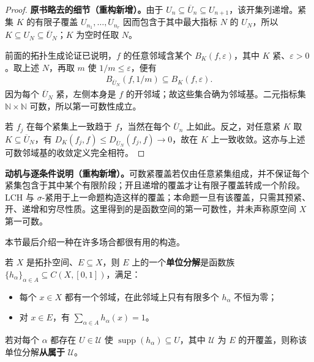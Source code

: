 \documentclass[../../main.tex]{subfiles}%
\begin{document}
\begin{proof}
\textbf{原书略去的细节（重构新增）。}由于 $U_n\subseteq\overline U_n\subseteq U_{n+1}$，该开集列递增。紧集 $K$ 的有限子覆盖 $U_{n_1},\ldots,U_{n_r}$ 因而包含于其中最大指标 $N$ 的 $U_N$，所以 $K\subseteq U_N\subseteq\overline U_N$；$K$ 为空时任取 $N$。

前面的拓扑生成论证已说明，$f$ 的任意邻域含某个 $B_K(f,\varepsilon)$，其中 $K$ 紧、$\varepsilon>0$。取上述 $N$，再取 $m$ 使 $1/m\le\varepsilon$，便有
\begin{align*}
B_{\overline U_N}(f,1/m)\subseteq B_K(f,\varepsilon).
\end{align*}
因为每个 $\overline U_N$ 紧，左侧本身是 $f$ 的开邻域；故这些集合确为邻域基。二元指标集 $\mathbb N\times\mathbb N$ 可数，所以第一可数性成立。

若 $f_j$ 在每个紧集上一致趋于 $f$，当然在每个 $\overline U_n$ 上如此。反之，对任意紧 $K$ 取 $K\subseteq\overline U_N$，有 $D_K(f_j,f)\le D_{\overline U_N}(f_j,f)\to0$，故在 $K$ 上一致收敛。这亦与上述可数邻域基的收敛定义完全相符。
\end{proof}
\begin{remark}
\textbf{动机与逐条件说明（重构新增）。}可数紧覆盖若仅由任意紧集组成，并不保证每个紧集包含于其中某个有限阶段；开且递增的覆盖才让有限子覆盖转成一个阶段。LCH 与 $\sigma$-紧用于上一命题构造这样的覆盖；本命题一旦有该覆盖，只需其预紧、开、递增和穷尽性质。这里得到的是函数空间的第一可数性，并未声称原空间 $X$ 第一可数。
\end{remark}
本节最后介绍一种在许多场合都很有用的构造。
\begin{definition}[单位分解及其从属关系]\label{definition:ch04-partition-unity}
若 $X$ 是拓扑空间、$E\subseteq X$，则 $E$ 上的一个\textbf{单位分解}是函数族 $\{h_\alpha\}_{\alpha\in A}\subseteq C(X,[0,1])$，满足：
\begin{itemize}
\item 每个 $x\in X$ 都有一个邻域，在此邻域上只有有限多个 $h_\alpha$ 不恒为零；
\item 对 $x\in E$，有 $\sum_{\alpha\in A}h_\alpha(x)=1$。
\end{itemize}
若对每个 $\alpha$ 都存在 $U\in\mathcal U$ 使 $\operatorname{supp}(h_\alpha)\subseteq U$，其中 $\mathcal U$ 为 $E$ 的开覆盖，则称该单位分解\textbf{从属于} $\mathcal U$。
\end{definition}
\end{document}
